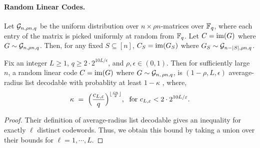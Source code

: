 \paragraph{Random Linear Codes.} Let $\cG_{n,\rho n,q}$ be the uniform distribution over $n\times \rho n$-matrices over $\F_q$, \ie where each entry of the matrix is picked uniformly at random from $\F_q$. Let $C = \im(G)$ where $G\sim \cG_{n,\rho n,q}$. Then, for any fixed $S\subseteq [n]$,  $C_S = \im(G_S) $ where $G_S\sim \cG_{n-|S|,\rho n,q}$. 

\begin{theorem}
Fix an integer $L \geq 1$, $q \geq 2\cdot 2^{10L/\epsilon}$, and $\rho,\epsilon \in (0,1)$.
Then for sufficiently large $n$, a random linear code $C = \im(G)$ where $G\sim \cG_{n,\,\rho n, q}$, is $(1-\rho, L,\epsilon)$ average-radius list decodable with probablity at least $1- \kappa$ , where, 
\[\kappa ~=~  \parens[\Big]{\frac{c_{L,\epsilon}}{q}}^{\lfloor \frac{\epsilon n}{2} \rfloor}, \;\text{ for } c_{L,\epsilon} < 2\cdot 2^{10L/\epsilon}  .\] 
\end{theorem}
\begin{proof}
	Their definition of average-radius list decodable gives an inequality for exactly $\ell$ distinct codewords. Thus, we obtain this bound by taking a union over their bounds for $\ell = 1, \cdots, L$. 
\end{proof}


